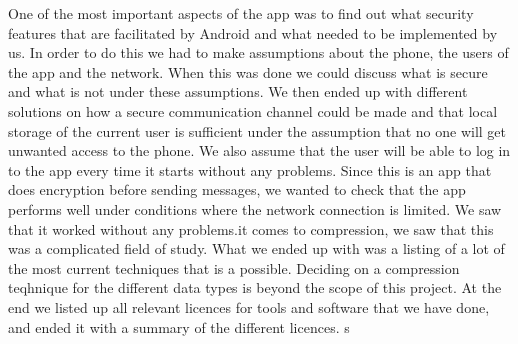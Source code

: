 \newline\newline
One of the most important aspects of the app was to find out what security features that are facilitated by Android and what needed to be implemented by us. In order to do this we had to make assumptions about the phone, the users of the app and the network. When this was done we could discuss what is secure and what is not under these assumptions. We then ended up with different solutions on how a secure communication channel could be made and that local storage of the current user is sufficient under the assumption that no one will get unwanted access to the phone. We also assume that the user will be able to log in to the app every time it starts without any problems.
\newline\newline
Since this is an app that does encryption before sending messages, we wanted to check that the app performs well under conditions where the network connection is limited. We saw that it worked without any problems.\newline\newlineWhen it comes to compression, we saw that this was a complicated field of study. What we ended up with was a listing of a lot of the most current techniques that is a possible. Deciding on a compression teqhnique for the different data types is beyond the scope of this project.
\newline\newline
At the end we listed up all relevant licences for tools and software that we have done, and ended it with a summary of the different licences. s